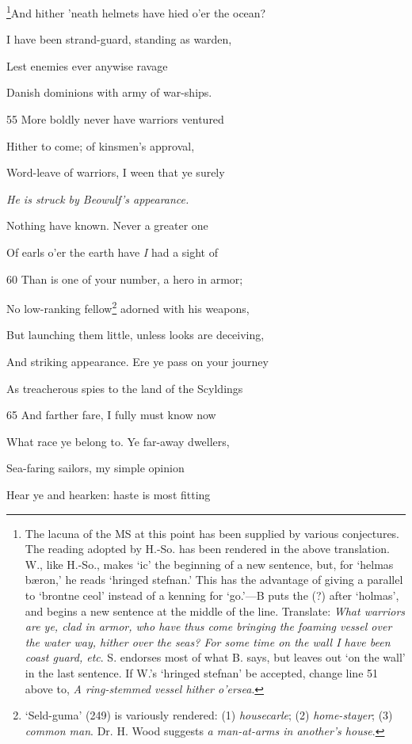 \footnote{The lacuna of the MS at this point has been supplied by various conjectures.
The reading adopted by H.-So. has been rendered in the above translation.
W., like H.-So., makes ‘ic’ the beginning of a new sentence, but, for ‘helmas
bæron,’ he reads ‘hringed stefnan.’ This has the advantage of giving a
parallel to ‘brontne ceol’ instead of a kenning for ‘go.’—B puts the (?)
after ‘holmas’, and begins a new sentence at the middle of the line. Translate:
\emph{What warriors are ye, clad in armor, who have thus come bringing the
foaming vessel over the water way, hither over the seas? For some time on
the wall I have been coast guard, etc}. S. endorses most of what B. says, but
leaves out ‘on the wall’ in the last sentence. If W.’s ‘hringed stefnan’ be
accepted, change line 51 above to, \emph{A ring-stemmed vessel hither o’ersea}.}And hither ’neath helmets have hied o’er the ocean?

I have been strand-guard, standing as warden,

Lest enemies ever anywise ravage

Danish dominions with army of war-ships.

55
More boldly never have warriors ventured

Hither to come; of kinsmen’s approval,

Word-leave of warriors, I ween that ye surely

\emph{He is struck by
Beowulf’s appearance.}

Nothing have known. Never a greater one

Of earls o’er the earth have \emph{I} had a sight of

60
Than is one of your number, a hero in armor;

No low-ranking fellow\footnote{‘Seld-guma’ (249) is variously rendered: (1) \emph{housecarle}; (2) \emph{home-stayer};
(3) \emph{common man}. Dr. H. Wood suggests \emph{a man-at-arms in another’s house}.} adorned with his weapons,

But launching them little, unless looks are deceiving,

And striking appearance. Ere ye pass on your journey

As treacherous spies to the land of the Scyldings

65
And farther fare, I fully must know now

What race ye belong to. Ye far-away dwellers,

Sea-faring sailors, my simple opinion

Hear ye and hearken: haste is most fitting


